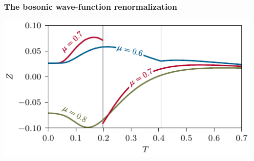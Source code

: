 \subsubsection{The bosonic wave-function renormalization}
\label{subsubsec:wave-function renormalization}
	{\fullWidthTwoColumnFigureSpacing}
	{%
		\includegraphics[width=\subcaptionFigureWidth]{gn/figures/Z_slice_1.pdf} %
		\captionsetup{width=\subcaptionFigureWidth}%
		\caption{%
			The bosonic wave-function renormalization $\zwave{\shom}{\mu}{T}$ as a function of temperature at fixed chemical potentials ${\mu \in \{ 0.55, 0.65, 0.75 \}}$ evaluated at the homogeneous minimum ${\shom = \sminhom ( \mu, T )}$.
		}%
		\label{fig:Z_slice_1}
	}%
	
